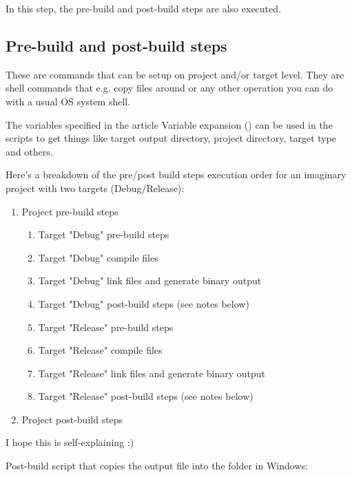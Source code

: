 In this step, the pre-build and post-build steps are also executed.


\subsection{Pre-build and post-build steps}

These are commands that can be setup on project and/or target level. They are shell commands that e.g. copy files around or any other operation you can do with a usual OS system shell.

The variables specified in the article Variable expansion () can be used in the scripts to get things like target output directory, project directory, target type and others.

Here's a breakdown of the pre/post build steps execution order for an imaginary project with two targets (Debug/Release):

\begin{enumerate}
\item Project pre-build steps
    \begin{enumerate}
    \item Target "Debug" pre-build steps
    \item Target "Debug" compile files
    \item Target "Debug" link files and generate binary output
    \item Target "Debug" post-build steps (see notes below)
    \item Target "Release" pre-build steps
    \item Target "Release" compile files
    \item Target "Release" link files and generate binary output
    \item Target "Release" post-build steps (see notes below)
    \end{enumerate}
\item Project post-build steps
\end{enumerate}

I hope this is self-explaining :)



Post-build script that copies the output file into the folder  in Windows: 

